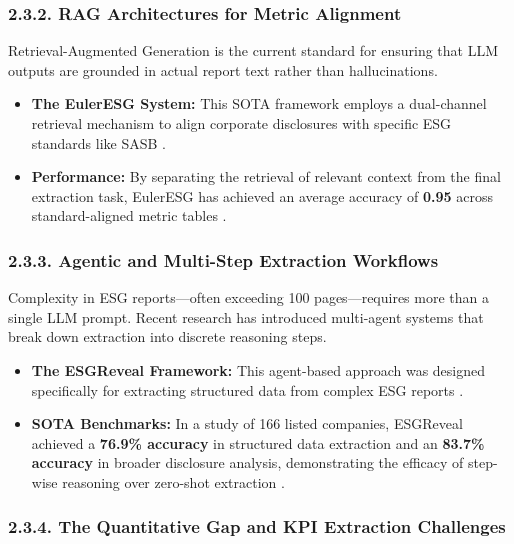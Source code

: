 \documentclass{article}
\begin{document}
\subsubsection*{2.3.2. RAG Architectures for Metric Alignment}

Retrieval-Augmented Generation is the current standard for ensuring that LLM outputs are grounded in actual report text rather than hallucinations.
\begin{itemize}
\item 

\textbf{The EulerESG System:} This SOTA framework employs a dual-channel retrieval mechanism to align corporate disclosures with specific ESG standards like SASB  \parencite{yi_ding_136f177b}.\item 

\textbf{Performance:} By separating the retrieval of relevant context from the final extraction task, EulerESG has achieved an average accuracy of \textbf{0.95} across standard-aligned metric tables  \parencite{yi_ding_136f177b}.
\end{itemize}
\subsubsection*{2.3.3. Agentic and Multi-Step Extraction Workflows}

Complexity in ESG reports—often exceeding 100 pages—requires more than a single LLM prompt. Recent research has introduced multi-agent systems that break down extraction into discrete reasoning steps.
\begin{itemize}
\item 

\textbf{The ESGReveal Framework:} This agent-based approach was designed specifically for extracting structured data from complex ESG reports  \parencite{yi_zou_37c055f7}.\item 

\textbf{SOTA Benchmarks:} In a study of 166 listed companies, ESGReveal achieved a \textbf{76.9\% accuracy} in structured data extraction and an \textbf{83.7\% accuracy} in broader disclosure analysis, demonstrating the efficacy of step-wise reasoning over zero-shot extraction  \parencite{yi_zou_37c055f7}.
\end{itemize}
\subsubsection*{2.3.4. The Quantitative Gap and KPI Extraction Challenges}
\end{document}
